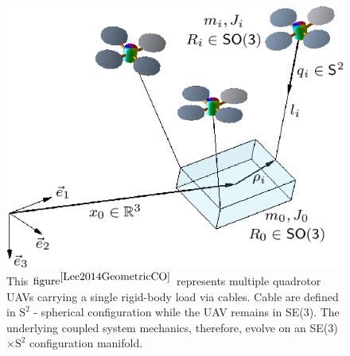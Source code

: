 \begin{figure}[H]
	\includegraphics[width=\columnwidth]{figure/payload_carrying.png}	
	\centering
	\caption{This $\text{figure}^{\cite{Lee2014GeometricCO}}$ represents multiple quadrotor UAVs carrying a single rigid-body load via cables. Cable are defined in $\text{S}^2$ - spherical configuration while the UAV remains in SE(3). The underlying coupled system mechanics, therefore, evolve on an SE(3)$\times\text{S}^2$ configuration manifold. }
	\label{fig:load_carrying}
\end{figure}

